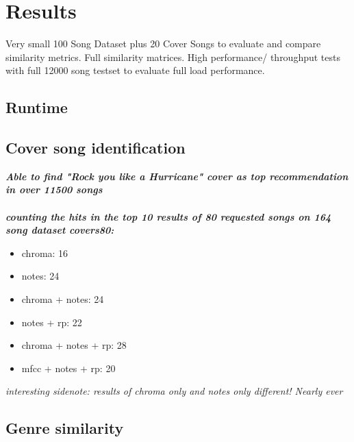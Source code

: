 
\chapter{Results}\label{bds2}

Very small 100 Song Dataset plus 20 Cover Songs to evaluate and compare similarity metrics. Full similarity matrices. 
High performance/ throughput tests with full 12000 song testset to evaluate full load performance.\\

\section{Runtime}

\section{Cover song identification}

\textit{\textbf{Able to find "Rock you like a Hurricane" cover as top recommendation in over 11500 songs\\}}
\ \\
\textit{\textbf{counting the hits in the top 10 results of 80 requested songs on 164 song dataset covers80:\\}}
\begin{itemize}
	\item chroma: 16
	\item notes: 24
	\item chroma + notes: 24
	\item notes + rp: 22
	\item chroma + notes + rp: 28
	\item mfcc + notes + rp: 20
\end{itemize}
\textit{interesting sidenote: results of chroma only and notes only different! Nearly ever}

\section{Genre similarity}

